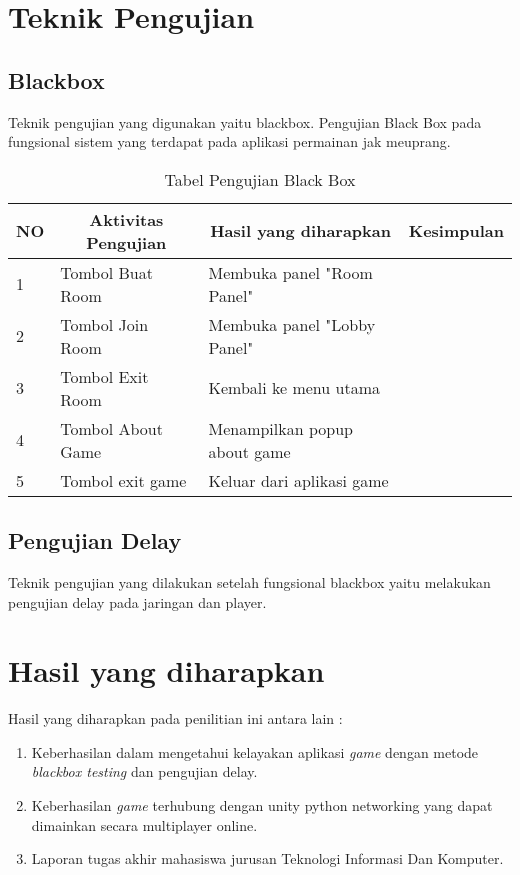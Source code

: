         \section{Teknik Pengujian}
        \subsection{Blackbox}
Teknik pengujian yang digunakan yaitu blackbox. Pengujian Black Box pada fungsional sistem yang terdapat pada aplikasi permainan jak meuprang.

    \begin{table}[h]
    \centering
    \caption{Tabel Pengujian Black Box}
    \label{lab:tabel-pengujian}
    \begin{tabular}{|l|l|l|l|}
    \hline
    \multicolumn{1}{|c|}{NO} & \multicolumn{1}{c|}{Aktivitas Pengujian} & \multicolumn{1}{c|}{Hasil yang diharapkan} & \multicolumn{1}{c|}{Kesimpulan} \\ \hline
    1                        & Tombol Buat Room                         & Membuka panel "Room Panel"                 &                                 \\ \hline
    2                        & Tombol Join Room                         & Membuka panel "Lobby Panel"                &                                 \\ \hline
    3                        & Tombol Exit Room                         & Kembali ke menu utama                      &                                 \\ \hline
    4                        & Tombol About Game                        & Menampilkan popup about game               &                                 \\ \hline
    5                        & Tombol exit game                         & Keluar dari aplikasi game                  &                                 \\ \hline
    \end{tabular}
    \end{table}
\newpage
\subsection{Pengujian Delay}
Teknik pengujian yang dilakukan setelah fungsional blackbox yaitu melakukan pengujian delay pada jaringan dan player.        
\section{Hasil yang diharapkan}
Hasil yang diharapkan pada penilitian ini antara lain :
\begin{enumerate}
    \item Keberhasilan dalam mengetahui kelayakan aplikasi \textit{game} dengan metode \textit{blackbox testing} dan pengujian delay.
    \item Keberhasilan \textit{game} terhubung dengan unity python networking yang dapat dimainkan secara multiplayer online.
    \item Laporan tugas akhir mahasiswa jurusan Teknologi Informasi Dan Komputer.
\end{enumerate}
